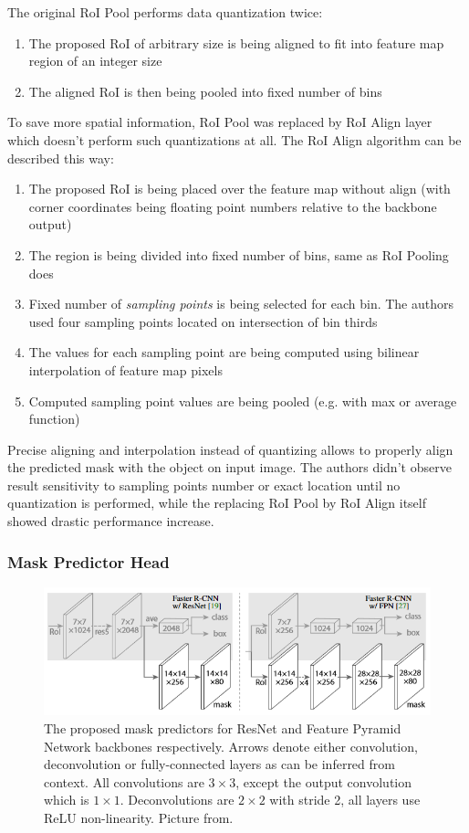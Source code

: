 \documentclass[thesis=B,english]{FITthesis}[2019/12/23]
\begin{document}
The original RoI Pool performs data quantization twice:
\begin{enumerate}
	\item The proposed RoI of arbitrary size is being aligned to fit into feature map region of an integer size
	\item The aligned RoI is then being pooled into fixed number of bins
\end{enumerate}
To save more spatial information, RoI Pool was replaced by RoI Align layer which doesn't perform such quantizations at all. The RoI Align algorithm can be described this way:
\begin{enumerate}
	\item The proposed RoI is being placed over the feature map without align (with corner coordinates being floating point numbers relative to the backbone output)
	\item The region is being divided into fixed number of bins, same as RoI Pooling does
	\item Fixed number of \textit{sampling points} is being selected for each bin. The authors used four sampling points located on intersection of bin thirds
	\item The values for each sampling point are being computed using bilinear interpolation of feature map pixels
	\item Computed sampling point values are being pooled (e.g. with max or average function)
\end{enumerate}
Precise aligning and interpolation instead of quantizing allows to properly align the predicted mask with the object on input image. The authors didn't observe result sensitivity to sampling points number or exact location until no quantization is performed, while the replacing RoI Pool by RoI Align itself showed drastic performance increase.

\subsubsection{Mask Predictor Head}

\begin{figure}[h]
	\centering
	\includegraphics[scale=0.6]{images/mask_predictors.png}
	\caption{The proposed mask predictors for ResNet and Feature Pyramid Network\cite{feature_pyramid_nets} backbones respectively. Arrows denote either convolution, deconvolution or fully-connected layers as can be inferred from context. All convolutions are $3 \times 3$, except the output convolution which is $1 \times 1$. Deconvolutions are $2 \times 2$ with stride 2, all layers use ReLU non-linearity. Picture from\cite{mask_rcnn}.}
\end{figure}
\end{document}
